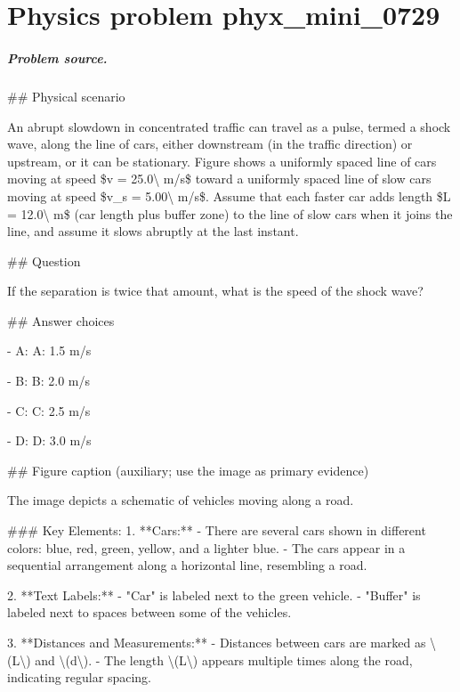 
\chapter{Physics problem phyx\_mini\_0729}
\label{ch:PhyXMiniProblems_problem_phyx_mini_0729}

\paragraph{Problem source.}
\#\# Physical scenario

An abrupt slowdown in concentrated traffic can travel as a pulse, termed a shock wave, along the line of cars, either downstream (in the traffic direction) or upstream, or it can be stationary. Figure shows a uniformly spaced line of cars moving at speed \$v = 25.0\textbackslash{} m/s\$ toward a uniformly spaced line of slow cars moving at speed \$v\_s = 5.00\textbackslash{} m/s\$. Assume that each faster car adds length \$L = 12.0\textbackslash{} m\$ (car length plus buffer zone) to the line of slow cars when it joins the line, and assume it slows abruptly at the last instant.

\#\# Question

If the separation is twice that amount, what is the speed of the shock wave?

\#\# Answer choices

- A: A: 1.5 m/s

- B: B: 2.0 m/s

- C: C: 2.5 m/s

- D: D: 3.0 m/s

\#\# Figure caption (auxiliary; use the image as primary evidence)

The image depicts a schematic of vehicles moving along a road.

\#\#\# Key Elements:
1. **Cars:**
   - There are several cars shown in different colors: blue, red, green, yellow, and a lighter blue.
   - The cars appear in a sequential arrangement along a horizontal line, resembling a road.

2. **Text Labels:**
   - "Car" is labeled next to the green vehicle.
   - "Buffer" is labeled next to spaces between some of the vehicles.

3. **Distances and Measurements:**
   - Distances between cars are marked as \textbackslash{}(L\textbackslash{}) and \textbackslash{}(d\textbackslash{}).
   - The length \textbackslash{}(L\textbackslash{}) appears multiple times along the road, indicating regular spacing.

